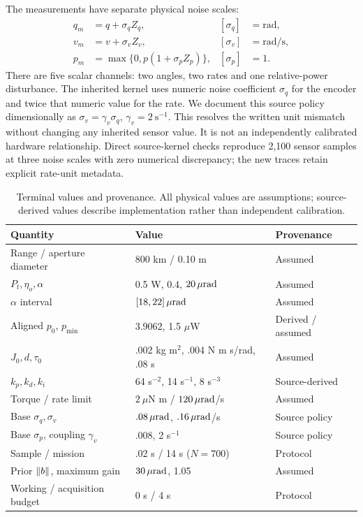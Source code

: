 The measurements have separate physical noise scales:
\begin{align}
q_m&=q+\sigma_q Z_q,&[\sigma_q]&=\mathrm{rad},\nonumber\\
v_m&=v+\sigma_v Z_v,&[\sigma_v]&=\mathrm{rad/s},\label{eq:sensors}\\
p_m&=\max\{0,p(1+\sigma_p Z_p)\},&[\sigma_p]&=1.\nonumber
\end{align}
There are five scalar channels: two angles, two rates and one relative-power disturbance. The inherited kernel uses numeric noise coefficient $\sigma_q$ for the encoder and twice that numeric value for the rate. We document this source policy dimensionally as $\sigma_v=\gamma_v\sigma_q$, $\gamma_v=2~\mathrm{s}^{-1}$. This resolves the written unit mismatch without changing any inherited sensor value. It is not an independently calibrated hardware relationship. Direct source-kernel checks reproduce 2,100 sensor samples at three noise scales with zero numerical discrepancy; the new traces retain explicit rate-unit metadata.

\begin{table}[t]
\caption{Terminal values and provenance. All physical values are assumptions; source-derived values describe implementation rather than independent calibration.}
\centering\footnotesize\setlength{\tabcolsep}{4pt}
\begin{tabular}{@{}p{}p{}p{}@{}}\toprule
Quantity & Value & Provenance\\\midrule
Range / aperture diameter & 800 km / 0.10 m & Assumed\\
$P_t,\eta_o,\alpha$ & 0.5 W, 0.4, $20\,\mu\mathrm{rad}$ & Assumed\\
$\alpha$ interval & $[18,22]\,\mu\mathrm{rad}$ & Assumed\\
Aligned $p_0$, $p_{\min}$ & 3.9062, 1.5 $\mu$W & Derived / assumed\\
$J_0,d,\tau_0$ & .002 kg m$^2$, .004 N m s/rad, .08 s & Assumed\\
$k_p,k_d,k_i$ & 64 s$^{-2}$, 14 s$^{-1}$, 8 s$^{-3}$ & Source-derived\\
Torque / rate limit & $2~\mu$N m / $120\,\mu\mathrm{rad}$/s & Assumed\\
Base $\sigma_q,\sigma_v$ & $.08\,\mu\mathrm{rad}$, $.16\,\mu\mathrm{rad}$/s & Source policy\\
Base $\sigma_p$, coupling $\gamma_v$ & .008, 2 s$^{-1}$ & Source policy\\
Sample / mission & .02 s / 14 s ($N=700$) & Protocol\\
Prior $\lVert b\rVert$, maximum gain & $30\,\mu\mathrm{rad}$, 1.05 & Assumed\\
Working / acquisition budget & 0 s / 4 s & Protocol\\\bottomrule
\end{tabular}
\label{tab:model}
\end{table}


